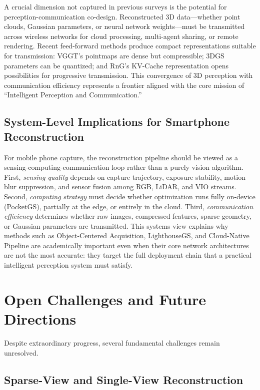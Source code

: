 \documentclass[journal]{IEEEtran}
\begin{document}
A crucial dimension not captured in previous surveys is the potential for perception-communication co-design. Reconstructed 3D data---whether point clouds, Gaussian parameters, or neural network weights---must be transmitted across wireless networks for cloud processing, multi-agent sharing, or remote rendering. Recent feed-forward methods produce compact representations suitable for transmission: VGGT's pointmaps are dense but compressible; 3DGS parameters can be quantized; and RnG's KV-Cache representation opens possibilities for progressive transmission. This convergence of 3D perception with communication efficiency represents a frontier aligned with the core mission of ``Intelligent Perception and Communication.''

\subsection{System-Level Implications for Smartphone Reconstruction}

For mobile phone capture, the reconstruction pipeline should be viewed as a sensing-computing-communication loop rather than a purely vision algorithm. First, \emph{sensing quality} depends on capture trajectory, exposure stability, motion blur suppression, and sensor fusion among RGB, LiDAR, and VIO streams. Second, \emph{computing strategy} must decide whether optimization runs fully on-device (PocketGS), partially at the edge, or entirely in the cloud. Third, \emph{communication efficiency} determines whether raw images, compressed features, sparse geometry, or Gaussian parameters are transmitted. This systems view explains why methods such as Object-Centered Acquisition, LighthouseGS, and Cloud-Native Pipeline are academically important even when their core network architectures are not the most accurate: they target the full deployment chain that a practical intelligent perception system must satisfy.

\section{Open Challenges and Future Directions}
\label{sec:challenges}

Despite extraordinary progress, several fundamental challenges remain unresolved.

\subsection{Sparse-View and Single-View Reconstruction}
\end{document}
